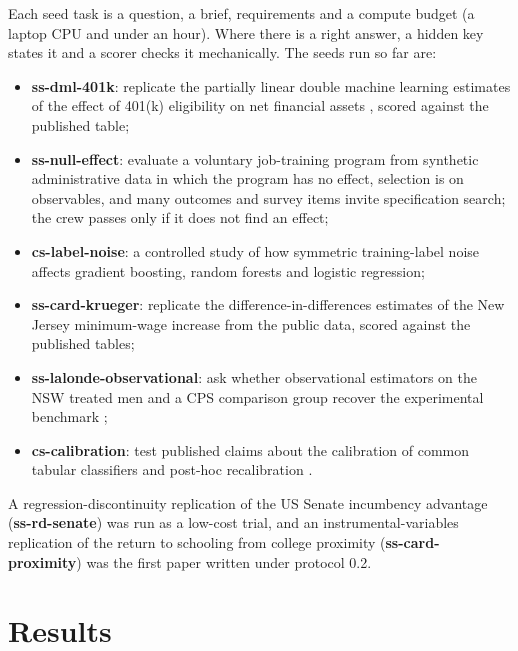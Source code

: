 \documentclass[11pt]{article}
\begin{document}
Each seed task is a question, a brief, requirements and a compute budget (a laptop CPU
and under an hour). Where there is a right answer, a hidden key states it and a scorer
checks it mechanically. The seeds run so far are:
\begin{itemize}[nosep]
  \item \textbf{ss-dml-401k}: replicate the partially linear double machine learning
        estimates of the effect of 401(k) eligibility on net financial assets
        \citep{chernozhukov2018}, scored against the published table;
  \item \textbf{ss-null-effect}: evaluate a voluntary job-training program from
        synthetic administrative data in which the program has no effect, selection
        is on observables, and many outcomes and survey items invite specification
        search; the crew passes only if it does not find an effect;
  \item \textbf{cs-label-noise}: a controlled study of how symmetric training-label
        noise affects gradient boosting, random forests and logistic regression;
  \item \textbf{ss-card-krueger}: replicate the difference-in-differences estimates of
        the New Jersey minimum-wage increase \citep{card1994minimum} from the public
        data, scored against the published tables;
  \item \textbf{ss-lalonde-observational}: ask whether observational estimators on the
        NSW treated men and a CPS comparison group recover the experimental benchmark
        \citep{lalonde1986,dehejia1999};
  \item \textbf{cs-calibration}: test published claims about the calibration of common
        tabular classifiers and post-hoc recalibration \citep{niculescumizil2005}.
\end{itemize}
A regression-discontinuity replication of the US Senate incumbency advantage
(\textbf{ss-rd-senate}) was run as a low-cost trial, and an instrumental-variables
replication of the return to schooling from college proximity \citep{card1993proximity}
(\textbf{ss-card-proximity}) was the first paper written under protocol 0.2.

\section{Results}\label{sec:results}
\end{document}

